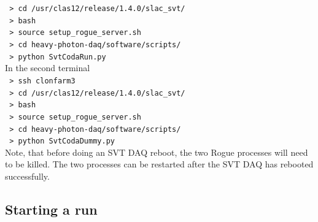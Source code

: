 \documentclass[12pt]{article}
\begin{document}
    \noindent
    \texttt{\hspace*{1cm} > cd /usr/clas12/release/1.4.0/slac\_svt/} \\
    \texttt{\hspace*{1cm} > bash} \\
    \texttt{\hspace*{1cm} > source setup\_rogue\_server.sh} \\
    \texttt{\hspace*{1cm} > cd heavy-photon-daq/software/scripts/} \\
    \texttt{\hspace*{1cm} > python SvtCodaRun.py} \\

\noindent
In the second terminal \\

    \noindent
    \texttt{\hspace*{1cm} > ssh clonfarm3} \\
    \texttt{\hspace*{1cm} > cd /usr/clas12/release/1.4.0/slac\_svt/} \\
    \texttt{\hspace*{1cm} > bash} \\
    \texttt{\hspace*{1cm} > source setup\_rogue\_server.sh} \\
    \texttt{\hspace*{1cm} > cd heavy-photon-daq/software/scripts/} \\
    \texttt{\hspace*{1cm} > python SvtCodaDummy.py} \\

Note, that before doing an SVT DAQ reboot, the two Rogue processes will need to 
be killed.  The two processes can be restarted after the SVT DAQ has rebooted
successfully. 

\subsection{Starting a run}
\label{sec:startstop}
\end{document}
